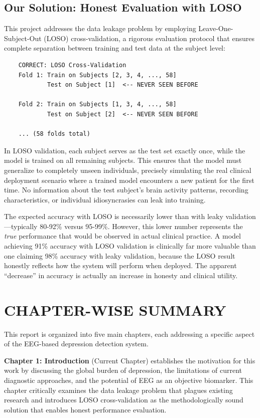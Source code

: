 \subsection{Our Solution: Honest Evaluation with LOSO}

This project addresses the data leakage problem by employing Leave-One-Subject-Out (LOSO) cross-validation, a rigorous evaluation protocol that ensures complete separation between training and test data at the subject level:

\begin{verbatim}
    CORRECT: LOSO Cross-Validation
    Fold 1: Train on Subjects [2, 3, 4, ..., 58]
            Test on Subject [1]  <-- NEVER SEEN BEFORE

    Fold 2: Train on Subjects [1, 3, 4, ..., 58]
            Test on Subject [2]  <-- NEVER SEEN BEFORE

    ... (58 folds total)
\end{verbatim}

In LOSO validation, each subject serves as the test set exactly once, while the model is trained on all remaining subjects. This ensures that the model must generalize to completely unseen individuals, precisely simulating the real clinical deployment scenario where a trained model encounters a new patient for the first time. No information about the test subject's brain activity patterns, recording characteristics, or individual idiosyncrasies can leak into training.

The expected accuracy with LOSO is necessarily lower than with leaky validation---typically 80-92\% versus 95-99\%. However, this lower number represents the \textit{true} performance that would be observed in actual clinical practice. A model achieving 91\% accuracy with LOSO validation is clinically far more valuable than one claiming 98\% accuracy with leaky validation, because the LOSO result honestly reflects how the system will perform when deployed. The apparent ``decrease'' in accuracy is actually an increase in honesty and clinical utility.

\section{CHAPTER-WISE SUMMARY}

This report is organized into five main chapters, each addressing a specific aspect of the EEG-based depression detection system.

\textbf{Chapter 1: Introduction} (Current Chapter) establishes the motivation for this work by discussing the global burden of depression, the limitations of current diagnostic approaches, and the potential of EEG as an objective biomarker. This chapter critically examines the data leakage problem that plagues existing research and introduces LOSO cross-validation as the methodologically sound solution that enables honest performance evaluation.

